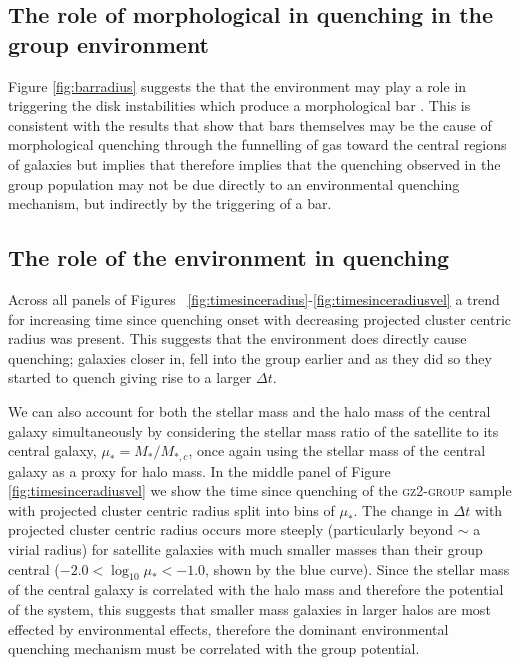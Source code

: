 \documentclass[useAMS,usenatbib]{mn2e}
\begin{document}
\subsection{The role of morphological in quenching in the group environment}\label{sec:rolemorphenv}

Figure \ref{fig:barradius} suggests the that the environment may play a role in triggering the disk instabilities which produce a morphological bar \citep{ref, ref, ref}. This is consistent with the results that show that bars themselves may be the cause of morphological quenching through the funnelling of gas toward the central regions of galaxies \citep{} but implies that therefore implies that the quenching observed in the group population may not be due directly to an environmental quenching mechanism, but indirectly by the triggering of a bar. 

\subsection{The role of the environment in quenching}\label{sec:roleenv}

Across all panels of Figures ~\ref{fig:timesinceradius}-\ref{fig:timesinceradiusvel} a trend for increasing time since quenching onset with decreasing projected cluster centric radius was present. This suggests that the environment does directly cause quenching; galaxies closer in, fell into the group earlier and as they did so they started to quench giving rise to a larger $\Delta t$.

We can also account for both the stellar mass and the halo mass of the central galaxy simultaneously by considering the stellar mass ratio of the satellite to its central galaxy, $\mu_* = M_*/M_{*,c}$, once again using the stellar mass of the central galaxy as a proxy for halo mass. In the middle panel of Figure \ref{fig:timesinceradiusvel} we show the time since quenching of the \textsc{gz2-group} sample with projected cluster centric radius split into bins of $\mu_*$. The change in $\Delta t $ with projected cluster centric radius occurs more steeply (particularly beyond $\sim$ a virial radius) for satellite galaxies with much smaller masses than their group central ($-2.0 < \log_{10}\mu_* < -1.0$, shown by the blue curve). Since the stellar mass of the central galaxy is correlated with the halo mass and therefore the potential of the system, this suggests that smaller mass galaxies in larger halos are most effected by environmental effects, therefore the dominant environmental quenching mechanism must be correlated with the group potential. 
\end{document}
